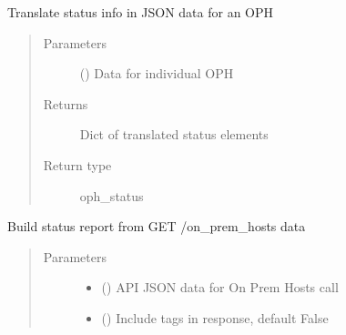 \documentclass[letterpaper,10pt,english]{sphinxmanual}
\begin{document}
\begin{fulllineitems}
\begin{fulllineitems}
\label{\detokenize{b1oph-class:bloxone.b1oph.oph_status}}
\sphinxAtStartPar
Translate status info in JSON data for an OPH
\begin{quote}\begin{description}
\item[{Parameters}] \leavevmode
\sphinxAtStartPar
{} () \textendash{} Data for individual OPH

\item[{Returns}] \leavevmode
\sphinxAtStartPar
Dict of translated status elements

\item[{Return type}] \leavevmode
\sphinxAtStartPar
oph\_status

\end{description}\end{quote}

\end{fulllineitems}


\begin{fulllineitems}
\label{\detokenize{b1oph-class:bloxone.b1oph.oph_status_rpt}}
\sphinxAtStartPar
Build  status report from GET /on\_prem\_hosts data
\begin{quote}\begin{description}
\item[{Parameters}] \leavevmode\begin{itemize}
\item {} 
\sphinxAtStartPar
{} () \textendash{} API JSON data for On Prem Hosts call

\item {} 
\sphinxAtStartPar
{} () \textendash{} Include tags in response, default False

\end{itemize}


\end{description}
\end{quote}
\end{fulllineitems}
\end{fulllineitems}
\end{document}
